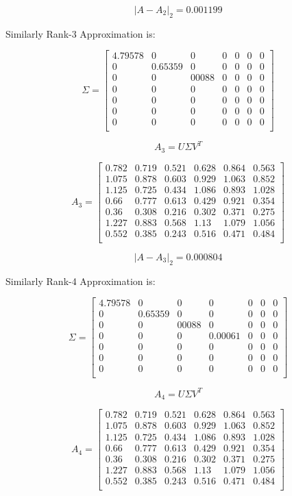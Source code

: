 \documentclass{article}
\begin{document}
$$
|A - A_2|_2 = 0.001199
$$

Similarly Rank-3 Approximation is:

$$
\Sigma = 
\begin{bmatrix}
4.79578 & 0 & 0 & 0 & 0 & 0 & 0\\
0 & 0.65359 & 0 & 0 & 0 & 0 & 0\\
0 & 0 & 00088 & 0 & 0 & 0 & 0\\
0 & 0 & 0 & 0 & 0 & 0 & 0\\
0 & 0 & 0 & 0 & 0 & 0 & 0\\
0 & 0 & 0 & 0 & 0 & 0 & 0\\
0 & 0 & 0 & 0 & 0 & 0 & 0\\
\end{bmatrix}
$$

$$
A_3 = 
U \Sigma V^T
$$ 

$$
A_3 = 
\begin{bmatrix}
0.782 & 0.719 & 0.521 & 0.628 & 0.864 & 0.563\\
1.075 & 0.878 & 0.603 & 0.929 & 1.063 & 0.852\\
1.125 & 0.725 & 0.434 & 1.086 & 0.893 & 1.028\\
0.66  & 0.777 & 0.613 & 0.429 & 0.921 & 0.354\\
0.36  & 0.308 & 0.216 & 0.302 & 0.371 & 0.275\\
1.227 & 0.883 & 0.568 & 1.13  & 1.079 & 1.056\\
0.552 & 0.385 & 0.243 & 0.516 & 0.471 & 0.484\\
\end{bmatrix}
$$

$$
|A - A_3|_2 = 0.000804
$$

Similarly Rank-4 Approximation is:

$$
\Sigma = 
\begin{bmatrix}
4.79578 & 0 & 0 & 0 & 0 & 0 & 0\\
0 & 0.65359 & 0 & 0 & 0 & 0 & 0\\
0 & 0 & 00088 & 0 & 0 & 0 & 0\\
0 & 0 & 0 & 0.00061 & 0 & 0 & 0\\
0 & 0 & 0 & 0 & 0 & 0 & 0\\
0 & 0 & 0 & 0 & 0 & 0 & 0\\
0 & 0 & 0 & 0 & 0 & 0 & 0\\
\end{bmatrix}
$$

$$
A_4 = 
U \Sigma V^T
$$ 

$$
A_4 = 
\begin{bmatrix}
0.782 & 0.719 & 0.521 & 0.628 & 0.864 & 0.563\\
1.075 & 0.878 & 0.603 & 0.929 & 1.063 & 0.852\\
1.125 & 0.725 & 0.434 & 1.086 & 0.893 & 1.028\\
0.66  & 0.777 & 0.613 & 0.429 & 0.921 & 0.354\\
0.36  & 0.308 & 0.216 & 0.302 & 0.371 & 0.275\\
1.227 & 0.883 & 0.568 & 1.13  & 1.079 & 1.056\\
0.552 & 0.385 & 0.243 & 0.516 & 0.471 & 0.484\\
\end{bmatrix}
$$
\end{document}
